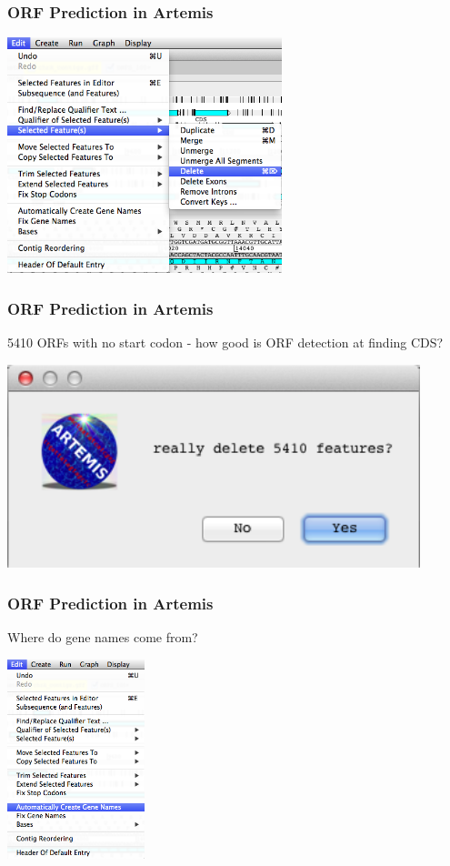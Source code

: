 \documentclass[table]{beamer}
\begin{document}
    \begin{frame}
      \frametitle{ORF Prediction in Artemis}    
      \begin{center}
        \includegraphics[width=0.6\textwidth]{images/artemis_orf10}     
      \end{center}
    \end{frame}

    \begin{frame}
      \frametitle{ORF Prediction in Artemis} 
      5410 ORFs with no start codon - how good is ORF detection at finding CDS?
      \begin{center}
        \includegraphics[width=0.9\textwidth]{images/artemis_orf11}     
      \end{center}
    \end{frame}

    \begin{frame}
      \frametitle{ORF Prediction in Artemis}
      Where do gene names come from?
      \begin{center}
        \includegraphics[width=0.3\textwidth]{images/artemis_orf12}     
      \end{center}
    \end{frame}
\end{document}

